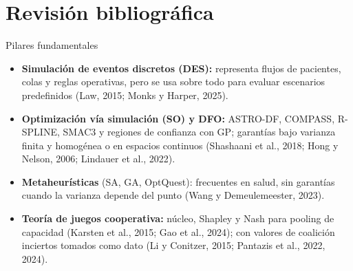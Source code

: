 \documentclass[aspectratio=169,11pt,xcolor=table]{beamer}
\begin{document}
\section{Revisión bibliográfica}

\begin{frame}{Pilares fundamentales}
  \begin{itemize}
    \item<1-> \textbf{Simulación de eventos discretos (DES):} representa flujos de
      pacientes, colas y reglas operativas, pero se usa sobre todo para evaluar
      escenarios predefinidos (Law, 2015; Monks y Harper, 2025).
    \item<2-> \textbf{Optimización vía simulación (SO) y DFO:} ASTRO-DF, COMPASS,
      R-SPLINE, SMAC3 y regiones de confianza con GP; garantías bajo varianza finita
      y homogénea o en espacios continuos (Shashaani et al., 2018; Hong y Nelson, 2006;
      Lindauer et al., 2022).
    \item<3-> \textbf{Metaheurísticas} (SA, GA, OptQuest): frecuentes en salud, sin
      garantías cuando la varianza depende del punto (Wang y Demeulemeester, 2023).
    \item<4-> \textbf{Teoría de juegos cooperativa:} núcleo, Shapley y Nash para
      pooling de capacidad (Karsten et al., 2015; Gao et al., 2024); con valores de
      coalición inciertos tomados como dato (Li y Conitzer, 2015; Pantazis et al., 2022, 2024).
  \end{itemize}
\end{frame}
\end{document}
